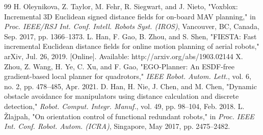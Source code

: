 \documentclass[letterpaper, 10 pt, conference]{ieeeconf}  %
\begin{document}
\begin{thebibliography}{99}
 H. Oleynikova, Z. Taylor, M. Fehr, R. Siegwart, and J. Nieto, "Voxblox: Incremental 3D Euclidean signed distance fields for on-board MAV planning," in \textit{Proc. IEEE/RSJ Int. Conf. Intell. Robots Syst. (IROS)}, Vancouver, BC, Canada, Sep. 2017, pp. 1366–1373.
 L. Han, F. Gao, B. Zhou, and S. Shen, "FIESTA: Fast incremental Euclidean distance fields for online motion planning of aerial robots," arXiv, Jul. 26, 2019. [Online]. Available: http://arxiv.org/abs/1903.02144
 X. Zhou, Z. Wang, H. Ye, C. Xu, and F. Gao, "EGO-Planner: An ESDF-free gradient-based local planner for quadrotors," \textit{IEEE Robot. Autom. Lett.}, vol. 6, no. 2, pp. 478–485, Apr. 2021.
 D. Han, H. Nie, J. Chen, and M. Chen, "Dynamic obstacle avoidance for manipulators using distance calculation and discrete detection," \textit{Robot. Comput. Integr. Manuf.}, vol. 49, pp. 98–104, Feb. 2018.
 L. Žlajpah, "On orientation control of functional redundant robots," in \textit{Proc. IEEE Int. Conf. Robot. Autom. (ICRA)}, Singapore, May 2017, pp. 2475–2482.		
	


\end{thebibliography}
\end{document}
